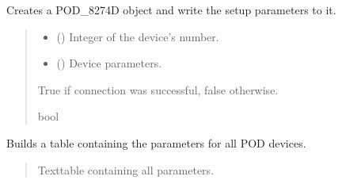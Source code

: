 \documentclass[letterpaper,10pt,english]{sphinxmanual}
\begin{document}
\begin{fulllineitems}
\begin{fulllineitems}
\label{\detokenize{Setup.SetupOneDevice:Setup.SetupOneDevice.Setup_8274D.Setup8274D._ConnectPODdevice}}
\pysigstartsignatures
{}
\pysigstopsignatures
\sphinxAtStartPar
Creates a POD\_8274D object and write the setup parameters to it.
\begin{quote}\begin{description}
\begin{itemize}
\item {} 
\sphinxAtStartPar
{} () \textendash{} Integer of the device’s number.

\item {} 
\sphinxAtStartPar
{} () \textendash{} Device parameters.

\end{itemize}

\sphinxAtStartPar
True if connection was successful, false otherwise.

\sphinxAtStartPar
bool

\end{description}\end{quote}

\end{fulllineitems}


\begin{fulllineitems}
\label{\detokenize{Setup.SetupOneDevice:Setup.SetupOneDevice.Setup_8274D.Setup8274D._GetPODdeviceParameterTable}}
\pysigstartsignatures
{}
\pysigstopsignatures
\sphinxAtStartPar
Builds a table containing the parameters for all POD devices.
\begin{quote}\begin{description}
\sphinxAtStartPar
Texttable containing all parameters.


\end{description}
\end{quote}
\end{fulllineitems}
\end{fulllineitems}
\end{document}

